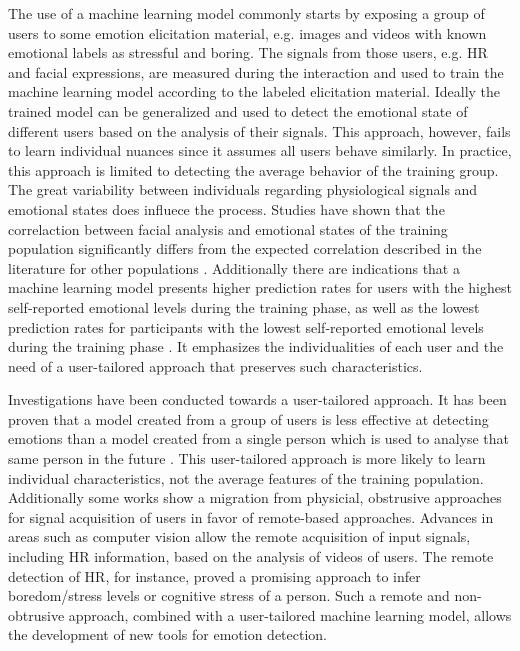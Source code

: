 The use of a machine learning model commonly starts by exposing a group of users to some emotion elicitation material, e.g. images and videos with known emotional labels as stressful and boring. The signals from those users, e.g. HR and facial expressions, are measured during the interaction and used to train the machine learning model according to the labeled elicitation material. Ideally the trained model can be generalized and used to detect the emotional state of different users based on the analysis of their signals. This approach, however, fails to learn individual nuances since it assumes all users behave similarly. In practice, this approach is limited to detecting the average behavior of the training group. The great variability between individuals regarding physiological signals and emotional states does influece the process. Studies have shown that the correlaction between facial analysis and emotional states of the training population significantly differs from the expected correlation described in the literature for other populations \parencite{grafsgaard2013automatically}. Additionally there are indications that a machine learning model presents higher prediction rates for users with the highest self-reported emotional levels during the training phase, as well as the lowest prediction rates for participants with the lowest self-reported emotional levels during the training phase \parencite{mcduffcogcam}. It emphasizes the individualities of each user and the need of a user-tailored approach that preserves such characteristics.

Investigations have been conducted towards a user-tailored approach. It has been proven that a model created from a group of users is less effective at detecting emotions than a model created from a single person which is used to analyse that same person in the future \parencite{bailenson2008real}. This user-tailored approach is more likely to learn individual characteristics, not the average features of the training population. Additionally some works show a migration from physicial, obstrusive approaches for signal acquisition of users in favor of remote-based approaches. Advances in areas such as computer vision allow the remote acquisition of input signals, including HR information, based on the analysis of videos of users. The remote detection of HR, for instance, proved a promising approach to infer boredom/stress levels \parencite{kukolja2014comparative} or cognitive stress \parencite{mcduff2014remote} of a person. Such a remote and non-obtrusive approach, combined with a user-tailored machine learning model, allows the development of new tools for emotion detection.


